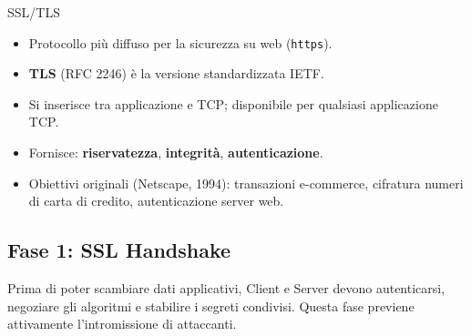 \documentclass[a4paper,12pt]{report}
\begin{document}
\begin{defbox}{SSL/TLS}
\begin{itemize}[noitemsep]
  \item Protocollo pi\`u diffuso per la sicurezza su web (\texttt{https}).
  \item \textbf{TLS} (RFC 2246) \`e la versione standardizzata IETF.
  \item Si inserisce tra applicazione e TCP; disponibile per qualsiasi applicazione TCP.
  \item Fornisce: \textbf{riservatezza}, \textbf{integrit\`a}, \textbf{autenticazione}.
  \item Obiettivi originali (Netscape, 1994): transazioni e-commerce, cifratura
        numeri di carta di credito, autenticazione server web.
\end{itemize}
\end{defbox}


\begin{center}
\end{center}

\subsection{Fase 1: SSL Handshake}
Prima di poter scambiare dati applicativi, Client e Server devono autenticarsi, negoziare gli algoritmi e stabilire i segreti condivisi. Questa fase previene attivamente l'intromissione di attaccanti.
\end{document}
